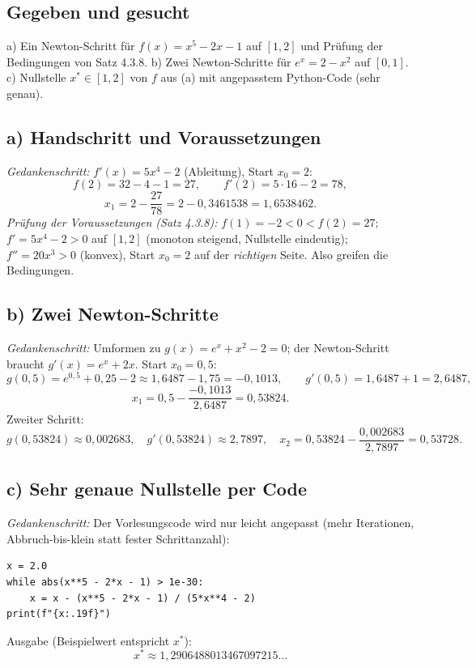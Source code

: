 
\subsection*{Gegeben und gesucht}
a) Ein Newton-Schritt für $f(x)=x^5-2x-1$ auf $[1,2]$ und Prüfung der
Bedingungen von Satz 4.3.8. b) Zwei Newton-Schritte für $e^{x}=2-x^2$ auf
$[0,1]$. c) Nullstelle $x^*\in[1,2]$ von $f$ aus (a) mit angepasstem
Python-Code (sehr genau).

\subsection*{a) Handschritt und Voraussetzungen}
\emph{Gedankenschritt:} $f'(x)=5x^4-2$ (Ableitung), Start $x_0=2$:
\begin{equation*}
  f(2)=32-4-1=27,\qquad f'(2)=5\cdot16-2=78,
\end{equation*}
\begin{equation*}
  x_1=2-\frac{27}{78}=2-0{,}3461538=1{,}6538462 .
\end{equation*}
\emph{Prüfung der Voraussetzungen (Satz 4.3.8):} $f(1)=-2<0<f(2)=27$;
$f'=5x^4-2>0$ auf $[1,2]$ (monoton steigend, Nullstelle eindeutig);
$f''=20x^3>0$ (konvex), Start $x_0=2$ auf der \emph{richtigen} Seite. Also
greifen die Bedingungen.

\subsection*{b) Zwei Newton-Schritte}
\emph{Gedankenschritt:} Umformen zu $g(x)=e^x+x^2-2=0$; der Newton-Schritt
braucht $g'(x)=e^x+2x$. Start $x_0=0{,}5$:
\begin{equation*}
  g(0{,}5)=e^{0{,}5}+0{,}25-2\approx1{,}6487-1{,}75=-0{,}1013,\qquad
  g'(0{,}5)=1{,}6487+1=2{,}6487,
\end{equation*}
\begin{equation*}
  x_1=0{,}5-\frac{-0{,}1013}{2{,}6487}=0{,}53824 .
\end{equation*}
Zweiter Schritt:
\begin{equation*}
  g(0{,}53824)\approx0{,}002683,\quad g'(0{,}53824)\approx2{,}7897,
  \quad x_2=0{,}53824-\frac{0{,}002683}{2{,}7897}=0{,}53728 .
\end{equation*}

\subsection*{c) Sehr genaue Nullstelle per Code}
\emph{Gedankenschritt:} Der Vorlesungscode wird nur leicht angepasst
(mehr Iterationen, Abbruch-bis-klein statt fester Schrittanzahl):
\begin{verbatim}
x = 2.0
while abs(x**5 - 2*x - 1) > 1e-30:
    x = x - (x**5 - 2*x - 1) / (5*x**4 - 2)
print(f"{x:.19f}")
\end{verbatim}
Ausgabe (Beispielwert entspricht $x^*$):
\begin{equation*}
  x^*\approx1{,}2906488013467097215\ldots
\end{equation*}

